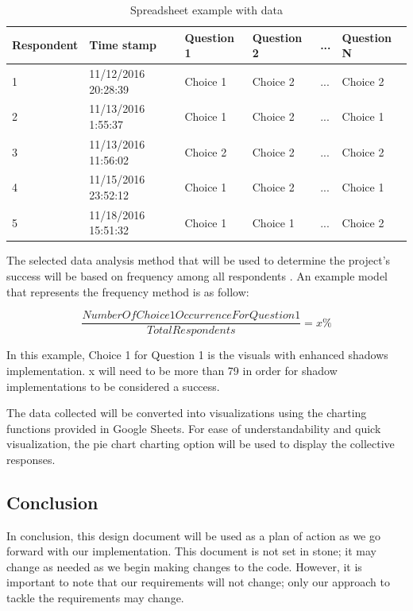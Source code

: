 \begin{flushleft}
\begin{center}
\begin{table}[H]
\caption{Spreadsheet example with data}
\begin{tabular}{ | m{5em} | m{15em} | m{7em} | m{7em} | m{7em} |  m{7em} | } 
\hline
\textbf{Respondent}  & \textbf{Time stamp}  & \textbf{Question 1} & \textbf{Question 2} & \textbf{...} & \textbf{Question N} \\ \hline
1 & 11/12/2016 20:28:39 & Choice 1 & Choice 2 & ... & Choice 2 \\ \hline
2 & 11/13/2016 1:55:37 & Choice 1 & Choice 2 & ... & Choice 1 \\ \hline
3 & 11/13/2016 11:56:02 & Choice 2 & Choice 2 & ... & Choice 2 \\ \hline 
4 & 11/15/2016 23:52:12 & Choice 1 & Choice 2 & ... & Choice 1 \\ \hline 
5 & 11/18/2016 15:51:32 & Choice 1 & Choice 1 & ... & Choice 2 \\ \hline 
\end{tabular}
\newline
\label{table:Example}
\end{table}
\end{center}

The selected data analysis method that will be used to determine the project's success will be based on frequency among all respondents \cite{SManalysis}. 
An example model that represents the frequency method is as follow:

\begin{equation}
\frac{Number Of Choice 1 Occurrence For Question 1}{Total Respondents} = x\%
\end{equation}

\vspace{3mm}
In this example, Choice 1 for Question 1 is the visuals with enhanced shadows implementation. 
x will need to be more than 79 in order for shadow implementations to be considered a success.

The data collected will be converted into visualizations using the charting functions provided in Google Sheets. 
For ease of understandability and quick visualization, the pie chart charting option will be used to display the collective responses. 

\newpage

\subsection{Conclusion}
In conclusion, this design document will be used as a plan of action as we go forward with our implementation.
This document is not set in stone; it may change as needed as we begin making changes to the code.
However, it is important to note that our requirements will not change; only our approach to tackle the requirements may change.


\end{flushleft}
